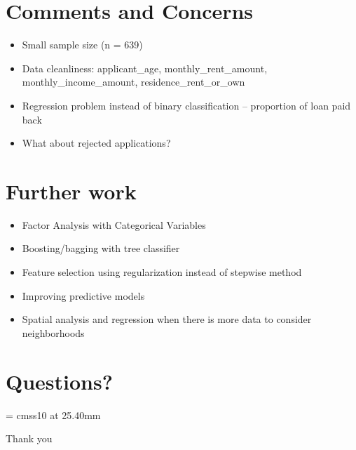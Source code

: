 \documentclass[a4paper, landscape]{article}
\begin{document}
\section{Comments and Concerns}

\begin{itemize}
	\item Small sample size (n = 639)
	\item Data cleanliness: applicant\_age, monthly\_rent\_amount, monthly\_income\_amount, residence\_rent\_or\_own
	\item Regression problem instead of binary classification -- proportion of loan paid back
	\item What about rejected applications?
	
	
\end{itemize}

\section{Further work}


\begin{itemize}
	\item Factor Analysis with Categorical Variables	
	\item Boosting/bagging with tree classifier
	\item Feature selection using regularization instead of stepwise method
	\item Improving predictive models
	\item Spatial analysis and regression when there is more data to consider neighborhoods
\end{itemize}

\newpage
\section*{Questions?}

\vspace{85mm}

      \begin{center}

        \font\endfont = cmss10 at 25.40mm
        \endfont 
        \baselineskip 20.0mm

        Thank you

      \end{center}    
	
\end{document}
